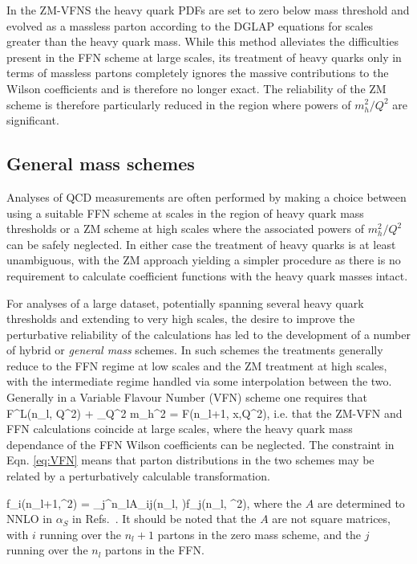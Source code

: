 In the ZM-VFNS the heavy quark PDFs are set to zero below mass threshold and evolved as a massless parton according to the DGLAP equations for scales greater than the heavy quark mass. While this method alleviates the difficulties present in the FFN scheme at large scales, its treatment of heavy quarks only in terms of massless partons completely ignores the massive contributions to the Wilson coefficients and is therefore no longer exact. The reliability of the ZM scheme is therefore particularly reduced in the region where powers of $m_h^2/Q^2$ are significant. 
\subsection{General mass schemes}
Analyses of QCD measurements are often performed by making a choice between using a suitable FFN scheme at scales in the region of heavy quark mass thresholds or a ZM scheme at high scales where the associated powers of $m_h^2/Q^2$ can be safely neglected. In either case the treatment of heavy quarks is at least unambiguous, with the ZM approach yielding a simpler procedure as there is no requirement to calculate coefficient functions with the heavy quark masses intact.

For analyses of a large dataset, potentially spanning several heavy quark thresholds and extending to very high scales, the desire to improve the perturbative reliability of the calculations has led to the development of a number of hybrid or \emph{general mass} schemes. In such schemes the treatments generally reduce to the FFN regime at low scales and the ZM treatment at high scales, with the intermediate regime handled via some interpolation between the two. Generally in a Variable Flavour Number (VFN) scheme one requires that
\be F^{L}(n_l, Q^2) + \lim_{Q^2 \gg m_h^2} \left[ F^{H}(n_l, Q^2,m_h^2)\right] =  F(n_l+1, x,Q^2), \label{eq:VFN}\ee
i.e. that the ZM-VFN and FFN calculations coincide at large scales, where the heavy quark mass dependance of the FFN Wilson coefficients can be neglected. The constraint in Eqn. \ref{eq:VFN} means that parton distributions in the two schemes may be related by a perturbatively calculable transformation.

\be f_i(n_l+1,\mu^2) = \sum_j^{n_l}A_{ij}\left(n_l, \right)\otimes f_j(n_l, \mu^2), \label{eq:FLVreln}\ee
where the $A$ are determined to NNLO in $\alpha_S$ in Refs.~\cite{Buza:1995ie,Buza:1996wv}. It should be noted that the $A$ are not square matrices, with $i$ running over the $n_l+1$ partons in the zero mass scheme, and the $j$ running over the $n_l$ partons in the FFN.


